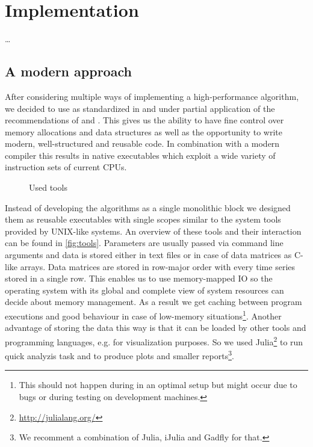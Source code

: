 \chapter{Implementation}
\label{ch:implementation}

\dots



\section{A modern approach}
\label{sec:implementation:approach}

After considering multiple ways of implementing a high-performance algorithm, we decided to use  as standardized in \cite{cpp14} and under partial application of the recommendations of \cite{effective_cpp} and \cite{effective_cpp2}. This gives us the ability to have fine control over memory allocations and data structures as well as the opportunity to write modern, well-structured and reusable code. In combination with a modern compiler this results in native executables which exploit a wide variety of instruction sets of current CPUs.

\begin{sidewaysfigure}
    \centering
    
    \caption{Used tools}
    \label{fig:tools}
\end{sidewaysfigure}

Instead of developing the algorithms as a single monolithic block we designed them as reusable executables with single scopes similar to the system tools provided by UNIX-like systems. An overview of these tools and their interaction can be found in \autoref{fig:tools}. Parameters are usually passed via command line arguments and data is stored either in text files or in case of data matrices as C-like arrays. Data matrices are stored in row-major order with every time series stored in a single row. This enables us to use memory-mapped IO so the operating system with its global and complete view of system resources can decide about memory management. As a result we get caching between program executions and good behaviour in case of low-memory situations\footnote{This should not happen during in an optimal setup but might occur due to bugs or during testing on development machines.}. Another advantage of storing the data this way is that it can be loaded by other tools and programming languages, e.g. for visualization purposes. So we used Julia\footnote{\url{http://julialang.org/}} to run quick analyzis task and to produce plots and smaller reports\footnote{We recomment a combination of Julia, iJulia and Gadfly for that.}.

